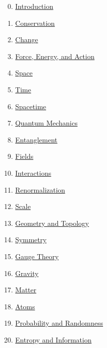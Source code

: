 \documentclass[11pt]{article}
\begin{document}
\begin{multicols}{2}
	\begin{enumerate}
		\setcounter{enumi}{-1}
		\item \href{https://mp.weixin.qq.com/s/JTnPICvX_PNbpngoFHWaXA}{Introduction}	%
		\item \href{https://mp.weixin.qq.com/s/wal5V7yRsaLyIG6uD8OEHQ}{Conservation} %
		\item \href{https://mp.weixin.qq.com/s/igdKBrrDKSLoQhcDzuAexg}{Change}	%
		\item \href{https://mp.weixin.qq.com/s/Ux--2LORUL3FgQVAnGl1yQ}{Force, Energy, and Action}	%
		\item \href{https://mp.weixin.qq.com/s/n_8wvE1tTrH-2ut4DoZRUg}{Space}	%
		\item \href{https://mp.weixin.qq.com/s/oCfU6iLKq7kCQAJOMJYhkQ}{Time}%
		\item \href{https://mp.weixin.qq.com/s/kvVVHq5NvB5Fnn7gbiYhSA}{Spacetime}	%
		\item \href{https://mp.weixin.qq.com/s/JzncY1EHBNt6gSnfbAlkpQ}{Quantum Mechanics}	%
		\item \href{https://mp.weixin.qq.com/s/kzj6SPAfgYFXvbnJ1VqpfQ}{Entanglement}	%
		\item \href{https://mp.weixin.qq.com/s/meACDx3Oj7snOFv9Bwwnog}{Fields}	%
		\item \href{https://mp.weixin.qq.com/s/ok17BXK15iaTxwxq6ZJ0Og}{Interactions}	%
		\item \href{https://mp.weixin.qq.com/s/KyG5FXUXgUUHvpAHa6cn3A}{Renormalization}	%
		\item \href{https://mp.weixin.qq.com/s/KYEaZOp9mX2K-Qwc0eNKOA}{Scale}	%
		\item \href{https://mp.weixin.qq.com/s/G8y2QVfv5f9YmDha3TNi_w}{Geometry and Topology}	%
		\item \href{https://mp.weixin.qq.com/s/v9f44-BDZFm0hZt7HUfQpQ}{Symmetry} 	%
		\item \href{https://mp.weixin.qq.com/s/R3aRXIKqFDNVFR0smnwqlA}{Gauge Theory}	%
		\item \href{https://mp.weixin.qq.com/s/gen9iBIFcnIxfcuLpAyLqA}{Gravity}	%
		\item \href{https://mp.weixin.qq.com/s/9KUI4aHBocDFYBdUYstVpg}{Matter}	%
		\item \href{https://mp.weixin.qq.com/s/i94b-DcyNGIH1_8ZdaZkKw}{Atoms} %
		\item \href{https://mp.weixin.qq.com/s/it7wCk89PW8spHUkB5krOw}{Probability and Randomness}	%
		\item \href{https://mp.weixin.qq.com/s/7l5Q0Bx8wHQ3eBTs3utRsQ}{Entropy and Information}	%

\end{enumerate}
\end{multicols}
\end{document}

